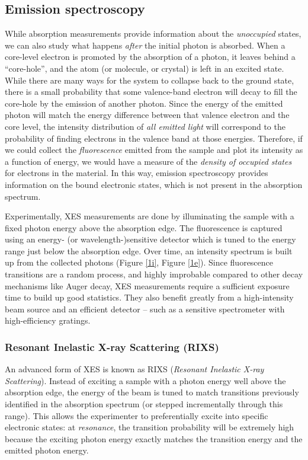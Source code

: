 \subsection{Emission spectroscopy}
While absorption measurements provide information about the \emph{unoccupied} states, we can also study what happens \emph{after} the initial photon is absorbed.  When a core-level electron is promoted by the absorption of a photon, it leaves behind a ``core-hole'', and the atom (or molecule, or crystal) is left in an excited state.  While there are many ways for the system to collapse back to the ground state, there is a small probability that some valence-band electron will decay to fill the core-hole by the emission of another photon.  Since the energy of the emitted photon will match the energy difference between that valence electron and the core level, the intensity distribution of \emph{all emitted light} will correspond to the probability of finding electrons in the valence band at those energies.  Therefore, if we could collect the \emph{fluorescence} emitted from the sample and plot its intensity as a function of energy, we would have a measure of the \emph{density of occupied states} for electrons in the material.  In this way, emission spectroscopy provides information on the bound electronic states, which is not present in the absorption spectrum.

Experimentally, XES measurements are done by illuminating the sample with a fixed photon energy above the absorption edge.  The fluorescence is captured using an energy- (or wavelength-)sensitive detector which is tuned to the energy range just below the absorption edge.  Over time, an intensity spectrum is built up from the collected photons (Figure \ref{1i}, Figure \ref{1e}).  Since fluorescence transitions are a random process, and highly improbable compared to other decay mechanisms like Auger decay, XES measurements require a sufficient exposure time to build up good statistics.  They also benefit greatly from a high-intensity beam source and an efficient detector -- such as a sensitive spectrometer with high-efficiency gratings.

\subsubsection{Resonant Inelastic X-ray Scattering (RIXS)}
An advanced form of XES is known as RIXS (\emph{Resonant Inelastic X-ray Scattering}).  Instead of exciting a sample with a photon energy well above the absorption edge, the energy of the beam is tuned to match transitions previously identified in the absorption spectrum (or stepped incrementally through this range).  This allows the experimenter to preferentially excite into specific electronic states: at \emph{resonance}, the transition probability will be extremely high because the exciting photon energy exactly matches the transition energy and the emitted photon energy.

